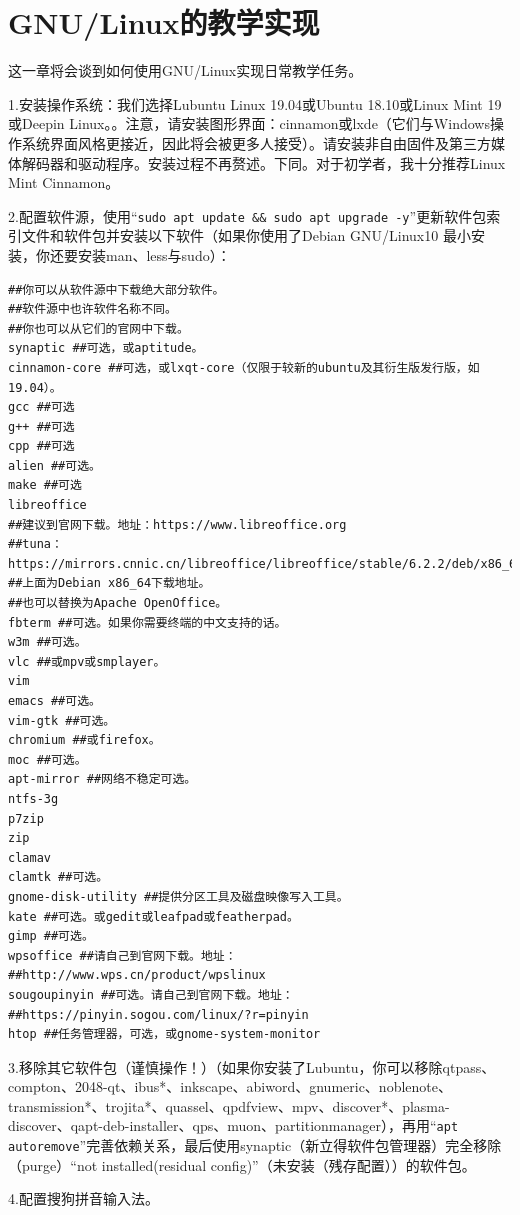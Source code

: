 \chapter{GNU/Linux的教学实现}
这一章将会谈到如何使用GNU/Linux实现日常教学任务。\par
1.安装操作系统：我们选择Lubuntu Linux 19.04或Ubuntu 18.10或Linux Mint 19 或Deepin Linux。。注意，请安装图形界面：cinnamon或lxde（它们与Windows操作系统界面风格更接近，因此将会被更多人接受）。请安装非自由固件及第三方媒体解码器和驱动程序。安装过程不再赘述。下同。对于初学者，我十分推荐Linux Mint Cinnamon。\par
2.配置软件源，使用“\verb|sudo apt update && sudo apt upgrade -y|”更新软件包索引文件和软件包并安装以下软件（如果你使用了Debian GNU/Linux10 最小安装，你还要安装man、less与sudo）：
\begin{verbatim}
##你可以从软件源中下载绝大部分软件。
##软件源中也许软件名称不同。
##你也可以从它们的官网中下载。
synaptic ##可选，或aptitude。
cinnamon-core ##可选，或lxqt-core（仅限于较新的ubuntu及其衍生版发行版，如19.04）。
gcc ##可选
g++ ##可选
cpp ##可选
alien ##可选。
make ##可选
libreoffice
##建议到官网下载。地址：https://www.libreoffice.org
##tuna：https://mirrors.cnnic.cn/libreoffice/libreoffice/stable/6.2.2/deb/x86_64/
##上面为Debian x86_64下载地址。
##也可以替换为Apache OpenOffice。
fbterm ##可选。如果你需要终端的中文支持的话。
w3m ##可选。
vlc ##或mpv或smplayer。
vim
emacs ##可选。
vim-gtk ##可选。
chromium ##或firefox。
moc ##可选。
apt-mirror ##网络不稳定可选。
ntfs-3g
p7zip
zip
clamav
clamtk ##可选。
gnome-disk-utility ##提供分区工具及磁盘映像写入工具。
kate ##可选。或gedit或leafpad或featherpad。
gimp ##可选。
wpsoffice ##请自己到官网下载。地址：
##http://www.wps.cn/product/wpslinux
sougoupinyin ##可选。请自己到官网下载。地址：
##https://pinyin.sogou.com/linux/?r=pinyin
htop ##任务管理器，可选，或gnome-system-monitor
\end{verbatim} \par
3.移除其它软件包（谨慎操作！）（如果你安装了Lubuntu，你可以移除qtpass、compton、2048-qt、ibus*、inkscape、abiword、gnumeric、noblenote、transmission*、trojita*、quassel、qpdfview、mpv、discover*、plasma-discover、qapt-deb-installer、qps、muon、partitionmanager），再用“\verb|apt autoremove|”完善依赖关系，最后使用synaptic（新立得软件包管理器）完全移除（purge）“not installed(residual config)”（未安装（残存配置））的软件包。\par
4.配置搜狗拼音输入法。
